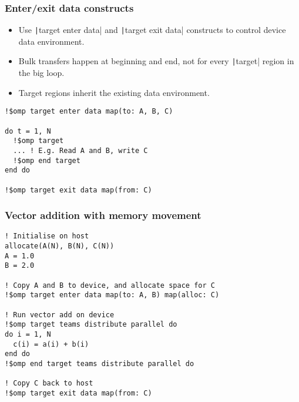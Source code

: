 \documentclass[aspectratio=169]{beamer}
\begin{document}
\begin{frame}[fragile]
\frametitle{Enter/exit data constructs}
\begin{itemize}
  \item Use \texttt|target enter data| and \texttt|target exit data| constructs to control device data environment.
  \item Bulk transfers happen at beginning and end, not for every \texttt|target| region in the big loop.
  \item Target regions inherit the existing data environment.
\end{itemize}

\begin{verbatim}
!$omp target enter data map(to: A, B, C)

do t = 1, N
  !$omp target
  ... ! E.g. Read A and B, write C
  !$omp end target
end do

!$omp target exit data map(from: C)

\end{verbatim}
\end{frame}

\begin{frame}[fragile]
\frametitle{Vector addition with memory movement}

\begin{verbatim}
! Initialise on host
allocate(A(N), B(N), C(N))
A = 1.0
B = 2.0

! Copy A and B to device, and allocate space for C
!$omp target enter data map(to: A, B) map(alloc: C)

! Run vector add on device
!$omp target teams distribute parallel do
do i = 1, N
  c(i) = a(i) + b(i)
end do
!$omp end target teams distribute parallel do

! Copy C back to host
!$omp target exit data map(from: C)

\end{verbatim}


\end{frame}

\end{document}
